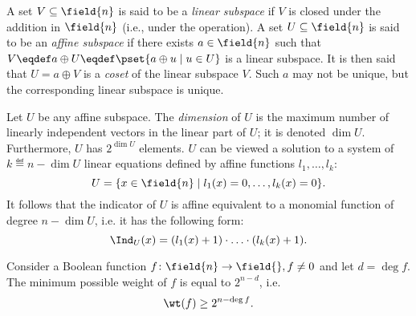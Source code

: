 A set $V \subseteq \field{n}$ is said to be a \emph{linear subspace} if $V$ is closed under the addition in $\field{n}$ (i.e., under the \txor{} operation). A set $U \subseteq \field{n}$ is said to be an \emph{affine subspace} if there exists $a \in \field{n}$ such that $V \eqdef a \oplus U \eqdef \pset{a \oplus u \mid u \in U}$ is a linear subspace. It is then said that $U = a \oplus V$ is a \emph{coset} of the linear subspace $V$. Such $a$ may not be unique, but the corresponding linear subspace is unique.

Let $U$ be any affine subspace. The \emph{dimension} of $U$ is the maximum number of linearly independent vectors in the linear part of $U$; it is denoted $\dim{U}$. Furthermore, $U$ has $2^{\dim{U}}$ elements. $U$ can be viewed a solution to a system of $k \eqdef n-\dim{U}$ linear equations defined by affine functions $l_1,\ldots,l_k$:
$$
U = \{x \in \field{n} \mid l_1(x) = 0, \ldots, l_k(x) = 0\}.
$$
It follows that the indicator of $U$ is affine equivalent to a monomial function of degree $n - \dim{U}$, i.e. it has the following form:
$$
\Ind_U(x) = (l_1(x)+1)\cdot \ldots \cdot (l_k(x)+1).
$$

Consider a Boolean function $f\colon \field{n} \to \field{}, f \ne 0$ and let $d = \deg{f}$. The minimum possible weight of $f$ is equal to $2^{n-d}$, i.e.
$$\wt(f) \ge 2^{n-\deg{f}}.$$
